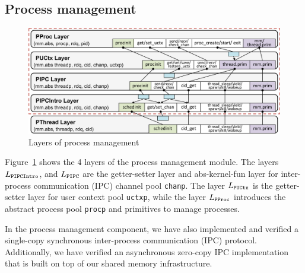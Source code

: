 \subsection{Process management}
\label{sec:base:pm} 


{
\begin{figure}\centering
\includegraphics[scale=0.6]{figs/pm_layer}	
\caption{Layers of process management }
\label{fig:base:pm:layers}
\end{figure}
}
 
Figure~\ref{fig:base:pm:layers} shows the 4 layers of the process
management module.  The layers $L_{\texttt{PIPCIntro}}$, and
$L_{\texttt{PIPC}}$ are the getter-setter layer and abs-kernel-fun layer for
inter-process communication (IPC) channel pool \verb"chanp".  The
layer $L_{\texttt{PUCtx}}$ is the getter-setter layer for user context pool
\verb"uctxp", while the layer $L_{\texttt{PProc}}$ introduces
the abstract process pool \verb"procp" and primitives to manage
processes.

In the process management component, we have also implemented and verified a single-copy
synchronous inter-process communication (IPC) protocol.
Additionally, we have verified an
asynchronous zero-copy IPC implementation that is built on top of our
shared memory infrastructure.


